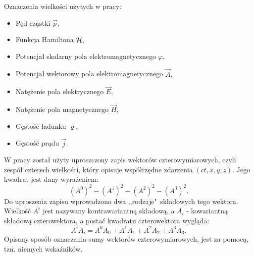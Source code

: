 Oznaczenia wielkości użytych w pracy:
\begin{itemize}
\item Pęd cząstki $\vec{p},$
\item Funkcja Hamiltona $\cal H,$
\item Potencjał skalarny pola elektromagnetycznego $\varphi,$
\item Potencjał wektorowy pola elektromagnetycznego $\vec{A},$
\item Natężenie pola elektrycznego $\vec{E},$
\item Natężenie pola magnetycznego $\vec{H},$
\item Gęstość ładunku $\varrho,$
\item Gęstość prądu $\vec{j}.$
\end{itemize}
W pracy został użyty uproszczony zapis wektorów czterowymiarowych, czyli zespół czterech wielkości, który opisuje współrzędne zdarzenia $(ct,x,y,z)$. Jego kwadrat jest dany wyrażeniem:
%
$$(A^{0})^{2}-(A^{1})^{2}-(A^{2})^{2}-(A^{3})^{2}.$$
%
Do uproszenia zapisu wprowadzono dwa ,,rodzaje"~składowych tego wektora. Wielkość $A^i$ jest nazywany kontrawariantną składową, a $A_i$ - kowariantną składową czterowektora, a postać kwadratu czterowektora wygląda:
%
$$A^{i}A_{i}=A^{0}A_{0}+A^{1}A_{1}+A^{2}A_{2}+A^{3}A_{3}.$$
%
Opisany sposób oznaczania sumy wektorów czterowymiarowych, jest za pomocą, tzn. niemych wskaźników.